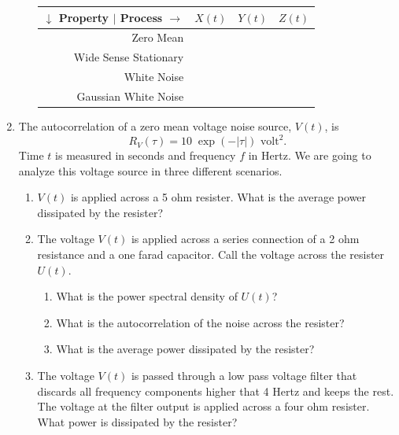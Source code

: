 \documentclass{article}[10pt]
\begin{document}
\begin{enumerate}
\begin{enumerate}
    \begin{tabular}{|r||c|c|c|}\hline
      $\downarrow$ Property $|$ Process $\rightarrow$                     & $X(t)$    &  $Y(t)$   & $Z(t)$    \\ \hline
      Zero Mean                                                           &           &           &           \\ \hline
      Wide Sense Stationary                                               &           &           &           \\ \hline
      White Noise                                                         &           &           &           \\ \hline
      Gaussian White Noise                                                &           &           &           \\ \hline
    \end{tabular}
  \end{enumerate}




\item The autocorrelation of a zero mean voltage noise source, $V(t)$, is
  $$ R_V (\tau ) = 10 \; \exp(-|\tau|)\mbox{ volt}^2.$$
  Time $t$ is measured in seconds and frequency $f$ in Hertz. We are going to analyze this voltage source in three different scenarios.
  \begin{enumerate}
  \item $V(t)$ is applied across a 5 ohm resister. What is the average power dissipated by the resister?


  \item  The voltage $V(t)$ is applied across a series connection of a 2 ohm resistance and a one farad capacitor. Call the voltage across the resister $U(t)$.
    \begin{enumerate}
    \item What is the power spectral density of $U(t)$?

    \item What is the autocorrelation of the noise across the resister?

    \item What is the average power dissipated by the resister?


    \end{enumerate}
  \item The voltage $V(t)$ is passed through a low pass voltage filter that discards all frequency components higher that 4 Hertz and keeps the rest. The voltage at the filter output is applied across a four ohm resister. What power is dissipated by the resister?
  \end{enumerate}


\end{enumerate}
\end{document}
